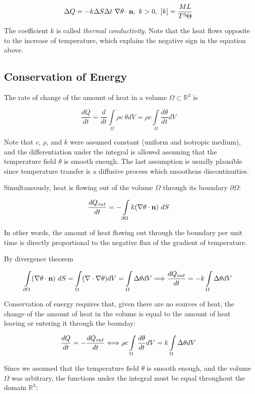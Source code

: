 $$ \Delta Q = -k\Delta S \Delta t ~ \nabla \theta \cdot \mathbf{n}, ~ k > 0, ~[k] = \frac{ML}{T^3\Theta} $$

The coefficient $k$ is called \emph{thermal conductivity}. Note that the heat flows opposite to the increase of temperature, which explains the negative sign in the equation above.

\subsection{Conservation of Energy}

The rate of change of the amount of heat in a volume $\Omega \subset \mathbb{R}^3$ is 

$$ \frac{dQ}{dt} = \frac{d}{dt}\int \limits_\Omega \rho c~\theta dV = \rho c \int \limits_\Omega \frac{d\theta}{dt} dV$$

Note that $c$, $\rho$, and $k$ were assumed constant (uniform and isotropic medium), and the differentiation under the integral is allowed assuming that the temperature field $\theta$ is smooth enough. The last assumption is usually plausible since temperature transfer is a diffusive process which smoothens discontinuities.

Simultaneously, heat is flowing out of the volume $\Omega$ through its boundary $\partial \Omega$:

$$ \frac{dQ_{out}}{dt} = -\int \limits_{\partial \Omega} k (\nabla \theta \cdot \mathbf{n}) ~dS$$

In other words, the amount of heat flowing out through the boundary per unit time is directly proportional to the negative flux of the gradient of temperature. 

By divergence theorem

$$ \int \limits_{\partial \Omega} (\nabla \theta \cdot \mathbf{n}) ~dS = \int \limits_{\Omega} (\nabla \cdot \nabla \theta) dV = \int \limits_{\Omega} \Delta\theta dV \Longrightarrow  \frac{dQ_{out}}{dt} = - k\int \limits_{\Omega} \Delta\theta dV $$

Conservation of energy requires that, given there are no sources of heat, the change of the amount of heat in the volume is equal to the amount of heat leaving or entering it through the bounday:

$$ \frac{dQ}{dt}  = -\frac{dQ_{out}}{dt} \Longleftrightarrow \rho c \int \limits_\Omega \frac{d\theta}{dt} dV = k\int \limits_{\Omega} \Delta\theta dV $$

Since we assumed that the temperature field $\theta$ is smooth enough, and the volume $\Omega$ was arbitrary, the functions under the integral must be equal throughout the domain $\mathbb{R}^3$:

